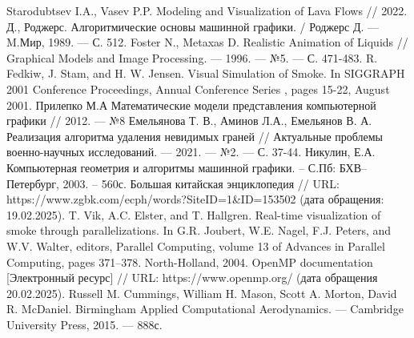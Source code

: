 \begin{thebibliography}{}
	 Starodubtsev I.A., Vasev P.P. Modeling and Visualization of Lava Flows // 2022.
	 Д., Роджерс. Алгоритмические основы машинной графики. / Роджерс Д.
	— M.Мир, 1989. — С. 512. 
	 Foster N., Metaxas D. Realistic Animation of Liquids // Graphical Models and Image Processing. --- 1996. --- №5. --- С. 471-483.
	R. Fedkiw, J. Stam, and H. W. Jensen. Visual Simulation of Smoke. In SIGGRAPH 2001 Conference Proceedings, Annual Conference Series , pages 15-22, August 2001.
	 Прилепко М.А Математические модели представления компьютерной графики // 2012. --- №8
	 Емельянова Т. В., Аминов Л.А., Емельянов В. А. Реализация алгоритма удаления невидимых граней // Актуальные проблемы военно-научных исследований. --- 2021. --- №2. --- С. 37-44.
	 Никулин, Е.А. Компьютерная геометрия и алгоритмы машинной
	графики. – С.Пб: БХВ–Петербург, 2003. – 560с. 
	 Большая китайская энциклопедия // URL: https://www.zgbk.com/ecph/words?SiteID=1\&ID=153502 (дата обращения: 19.02.2025).
	 T. Vik, A.C. Elster, and T. Hallgren. Real-time visualization of smoke through parallelizations. In
	G.R. Joubert, W.E. Nagel, F.J. Peters, and W.V. Walter, editors, Parallel Computing, volume 13 of Advances in Parallel Computing, pages 371–378. North-Holland, 2004.
	 OpenMP documentation [Электронный ресурс] // URL: https://www.openmp.org/ (дата обращения 20.02.2025).
	 Russell M. Cummings, William H. Mason, Scott A. Morton, David R. McDaniel. Birmingham Applied Computational Aerodynamics. --- Cambridge University Press,  2015. --- 888с.
\end{thebibliography}
